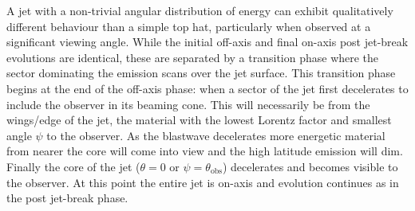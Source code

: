 \documentclass[twocolumn]{aastex62}
\newcommand{\thobs}{\ensuremath{\theta_{\mathrm{obs}}}}
\begin{document}
A jet with a non-trivial angular distribution of energy can exhibit qualitatively different behaviour than a simple top hat, particularly when observed at a significant viewing angle.  While the initial off-axis and final on-axis post jet-break evolutions are identical, these are separated by a transition phase where the sector dominating the emission scans over the jet surface.  This transition phase begins at the end of the off-axis phase: when a sector of the jet first decelerates to include the observer in its beaming cone.  This will necessarily be from the wings/edge of the jet, the material with the lowest Lorentz factor and smallest angle $\psi$ to the observer.  As the blastwave decelerates more energetic material from nearer the core will come into view and the high latitude emission will dim.  Finally the core of the jet ($\theta = 0$ or $\psi = \thobs$) decelerates and becomes visible to the observer.  At this point the entire jet is on-axis and evolution continues as in the post jet-break phase.
\end{document}
